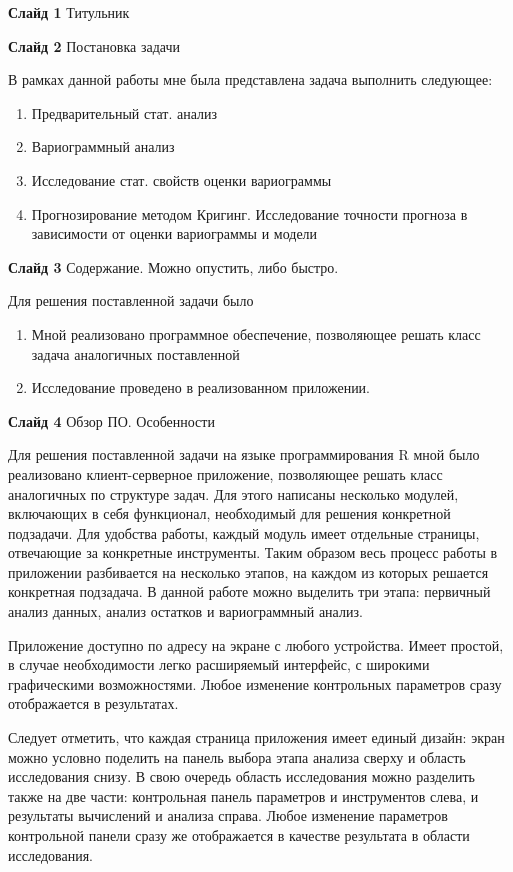 \documentclass[a4paper,10pt]{report}
\begin{document}
\textbf{Слайд 1} Титульник

\textbf{Слайд 2} Постановка задачи

В рамках данной работы мне была представлена задача выполнить следующее:
\begin{enumerate}
	\item Предварительный стат. анализ
	\item Вариограммный анализ
	\item Исследование стат. свойств оценки вариограммы
	\item Прогнозирование методом Кригинг. Исследование точности прогноза в зависимости от оценки вариограммы и модели
\end{enumerate}

\textbf{Слайд 3} Содержание. Можно опустить, либо быстро.

Для решения поставленной задачи было
\begin{enumerate}
	\item Мной реализовано программное обеспечение, позволяющее решать класс задача аналогичных поставленной
	\item Исследование проведено в реализованном приложении.
\end{enumerate}

\textbf{Слайд 4} Обзор ПО. Особенности

Для решения поставленной задачи на языке программирования R мной было реализовано клиент-серверное приложение, позволяющее решать класс аналогичных по структуре задач. Для этого написаны несколько модулей, включающих в себя функционал, необходимый для решения конкретной подзадачи. Для удобства работы, каждый модуль имеет отдельные страницы, отвечающие за конкретные инструменты. Таким образом весь процесс работы в приложении разбивается на несколько этапов, на каждом из которых решается конкретная подзадача. В данной работе можно выделить три этапа: первичный анализ данных, анализ остатков и вариограммный анализ.

Приложение доступно по адресу на экране с любого устройства. Имеет простой, в случае необходимости легко расширяемый интерфейс, с широкими графическими возможностями. Любое изменение контрольных параметров сразу отображается в результатах.

Следует отметить, что каждая страница приложения имеет единый дизайн: экран можно условно поделить на панель выбора этапа анализа сверху и область исследования снизу. В свою очередь область исследования можно разделить также на две части: контрольная панель параметров и инструментов слева, и результаты вычислений и анализа справа. Любое изменение параметров контрольной панели сразу же отображается в качестве результата в области исследования.
\end{document}
